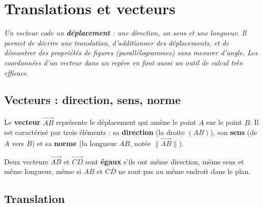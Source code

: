 \chapter{Translations et vecteurs}

\noindent\textit{Un vecteur code un \textbf{déplacement} : une direction, un sens et une
longueur. Il permet de décrire une translation, d'additionner des déplacements, et de
démontrer des propriétés de figures (parallélogrammes) sans mesurer d'angle. Les
coordonnées d'un vecteur dans un repère en font aussi un outil de calcul très efficace.}
\vspace{8pt}

\connecteBanner

\section{Vecteurs : direction, sens, norme}

\begin{definition}[Vecteur]
Le \textbf{vecteur} $\vec{AB}$ représente le déplacement qui amène le point $A$ sur le
point $B$. Il est caractérisé par trois éléments : sa \textbf{direction} (la droite $(AB)$),
son \textbf{sens} (de $A$ vers $B$) et sa \textbf{norme} (la longueur $AB$, notée
$\|\vec{AB}\|$).
\end{definition}

\begin{illus}
\end{illus}

\begin{remarque}
Deux vecteurs $\vec{AB}$ et $\vec{CD}$ sont \textbf{égaux} s'ils ont même direction, même
sens et même longueur, même si $AB$ et $CD$ ne sont pas au même endroit dans le plan.
\end{remarque}

\section{Translation}

